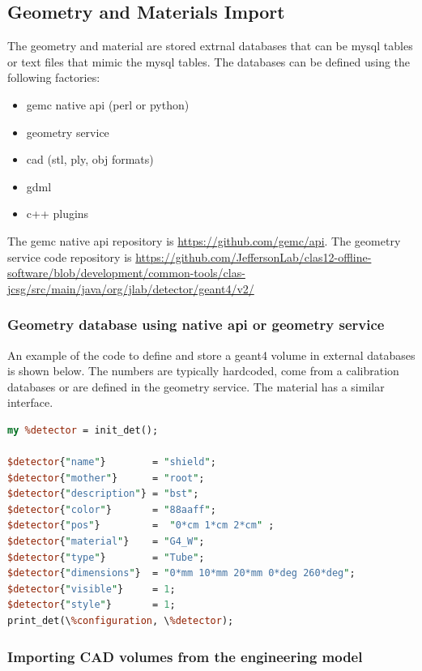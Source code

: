 \subsection{Geometry and Materials Import}

The geometry and material are stored extrnal databases that can be mysql tables or text files that mimic the mysql tables.
The databases can be defined using the following factories:

\begin{itemize}
	\item gemc native api (perl or python)
	\item geometry service
	\item cad (stl, ply, obj formats)
	\item gdml
	\item c++ plugins
\end{itemize}

The gemc native api repository is \url{https://github.com/gemc/api}. The geometry service code repository is
\url{https://github.com/JeffersonLab/clas12-offline-software/blob/development/common-tools/clas-jcsg/src/main/java/org/jlab/detector/geant4/v2/}


\subsubsection{Geometry database using native api or geometry service}

An example of the code to define and store a geant4 volume in external databases is shown below. The
numbers are typically hardcoded, come from a calibration databases or are defined in the geometry service. The material
has a similar interface.

\begin{lstlisting}[language=Perl]
my %detector = init_det();

$detector{"name"}        = "shield";
$detector{"mother"}      = "root";
$detector{"description"} = "bst";
$detector{"color"}       = "88aaff";
$detector{"pos"}         =  "0*cm 1*cm 2*cm" ;
$detector{"material"}    = "G4_W";
$detector{"type"}        = "Tube";
$detector{"dimensions"}  = "0*mm 10*mm 20*mm 0*deg 260*deg";
$detector{"visible"}     = 1;
$detector{"style"}       = 1;
print_det(\%configuration, \%detector);

\end{lstlisting}


\subsubsection{Importing CAD volumes from the engineering model}


